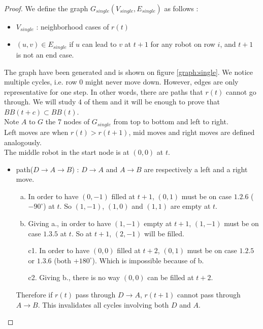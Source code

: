 \documentclass[11pt, a4paper]{article}
\theoremstyle{plain}
\theoremstyle{definition}
\theoremstyle{remark}
\begin{document}
\begin{proof}

We define the graph $G_{single}(V_{single}, E_{single})$ as follows :
\begin{itemize}
  \item $V_{single}$ : neighborhood cases of $r(t)$
  \item $(u,v) \in E_{single}$ if $u$ can lead to $v$ at $t+1$ for any robot on
        row $i$, and $t+1$ is not an end case.
\end{itemize}
The graph have been generated and is shown on figure \ref{graph:single}. We
notice multiple cycles, i.e. row $0$ might never move down. However, edges are
only representative for one step. In other words, there are paths that $r(t)$
cannot go through. We will study 4 of them and it will be enough to prove that
$BB(t+c) \subset BB(t)$. \\

\noindent
Note $A$ to $G$ the 7 nodes of $G_{single}$ from top to bottom and left to
right. \\
Left moves are when $r(t) > r(t+1)$, mid moves and right moves are defined
analogously. \\
The middle robot in the start node is at $(0,0)$ at $t$.
\begin{itemize}
  \item path($D \rightarrow A \rightarrow B$) : $D \rightarrow A$ and $A
  \rightarrow B$ are respectively a left and a right move.
  \begin{enumerate}[a.]
    \item In order to have $(0,-1)$ filled at $t+1$, $(0,1)$ must be on case
          $1.2.6$ ($-90^{\circ}$) at $t$. So $(1,-1)$, $(1,0)$ and $(1,1)$ are
          empty at $t$.
    \item Giving a., in order to have $(1,-1)$ empty at $t+1$, $(1,-1)$ must be
          on case $1.3.5$ at $t$. So at $t+1$, $(2,-1)$ will be filled.
    \item[c1.] In order to have $(0,0)$ filled at $t+2$, $(0,1)$ must be on case
          $1.2.5$ or $1.3.6$ (both $+180^{\circ}$). Which is impossible because
          of b.
    \item[c2.] Giving b., there is no way $(0,0)$ can be filled at $t+2$.
  \end{enumerate}
  Therefore if $r(t)$ pass through $D \rightarrow A$, $r(t+1)$ cannot pass
  through $A \rightarrow B$. This invalidates all cycles involving both $D$ and
  $A$.
\end{itemize}

\end{proof}
\end{document}
